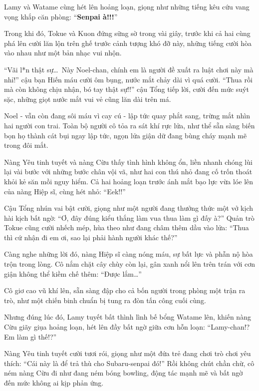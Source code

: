 \documentclass[../main.tex]{subfiles}
\begin{document}

Lamy và Watame cùng hét lên hoảng loạn, giọng như những tiếng kêu cứu vang vọng khắp căn phòng: ``\textbf{Senpai à!!!}''

Trong khi đó, Tokue và Kuon đứng sững sờ trong vài giây, trước khi cả hai cùng phá lên cười lăn lộn trên ghế trước cảnh tượng khó đỡ này, những tiếng cười hòa vào nhau như một bản nhạc vui nhộn.

``Vãi l*n thật sự\dots\ Này Noel-chan, chính em là người đề xuất ra luật chơi này mà nhỉ!'' cậu bạn Hiến máu cười ôm bụng, nước mắt chảy dài vì quá cười. ``Thua rồi mà còn không chịu nhận, bó tay thật sự!!'' cậu Tổng tiếp lời, cười đến mức suýt sặc, những giọt nước mắt vui vẻ cũng lăn dài trên má.

Noel - vẫn còn đang sôi máu vì cay cú - lập tức quay phắt sang, trừng mắt nhìn hai người con trai. Toàn bộ người cô tỏa ra sát khí rực lửa, như thể sẵn sàng biến bọn họ thành cát bụi ngay lập tức, ngọn lửa giận dữ đang bùng cháy mạnh mẽ trong đôi mắt.

Nàng Yêu tinh tuyết và nàng Cừu thấy tình hình không ổn, liền nhanh chóng lùi lại vài bước với những bước chân vội vã, như hai con thú nhỏ đang cố trốn thoát khỏi kẻ săn mồi nguy hiểm. Cả hai hoảng loạn trước ánh mắt bạo lực vừa lóe lên của nàng Hiệp sĩ, cùng hét nhỏ: ``Eek!!''

Cậu Tổng nhún vai bật cười, giọng như một người đang thưởng thức một vở kịch hài kịch bất ngờ: ``Ơ, đây đúng kiểu thắng làm vua thua làm gì đấy à?'' Quản trò Tokue cũng cười nhếch mép, hùa theo như đang châm thêm dầu vào lửa: ``Thua thì cứ nhận đi em ơi, sao lại phải hành người khác thế?''

Càng nghe những lời đó, nàng Hiệp sĩ càng nóng máu, sự bất lực và phẫn nộ hòa trộn trong lòng. Cô nắm chặt cây chùy còn lại, gân xanh nổi lên trên trán với cơn giận không thể kiềm chế thêm: ``Được lắm\dots''

Cô giơ cao vũ khí lên, sẵn sàng đập cho cả bốn người trong phòng một trận ra trò, như một chiến binh chuẩn bị tung ra đòn tấn công cuối cùng.

Nhưng đúng lúc đó, Lamy tuyết bất thình lình bế bổng Watame lên, khiến nàng Cừu giãy giụa hoảng loạn, hét lên đầy bất ngờ giữa cơn hỗn loạn: ``Lamy-chan!? Em làm gì thế!?''

Nàng Yêu tinh tuyết cười tươi rói, giọng như một đứa trẻ đang chơi trò chơi yêu thích: ``Cái này là để trả thù cho Subaru-senpai đó!'' Rồi không chút chần chừ, cô ném nàng Cừu đi như đang ném bóng bowling, động tác mạnh mẽ và bất ngờ đến mức không ai kịp phản ứng.
\end{document}
